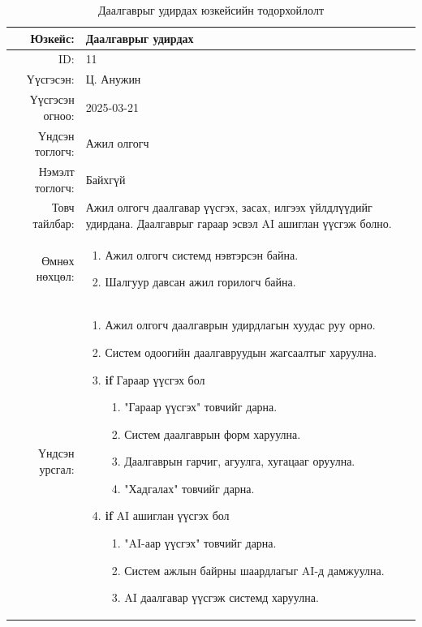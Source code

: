 \begin{longtable}{|r|p{11.5cm}|}
    \caption{Даалгаврыг удирдах юзкейсийн тодорхойлолт}
    \label{table:usecase11}\\ \hline
    {Юзкейс:} & {Даалгаврыг удирдах}\\ \hline
    {ID:} & {11}\\ \hline
    {Үүсгэсэн:} & {Ц. Анужин}\\ \hline
    {Үүсгэсэн огноо:} & {2025-03-21}\\ \hline
    {Үндсэн тоглогч:} & {Ажил олгогч}\\ \hline
    {Нэмэлт тоглогч:} & {Байхгүй}\\ \hline
    {Товч тайлбар:} & {Ажил олгогч даалгавар үүсгэх, засах, илгээх үйлдлүүдийг удирдана. Даалгаврыг гараар эсвэл AI ашиглан үүсгэж болно.}\\ \hline
    {Өмнөх нөхцөл:} & {\begin{enumerate}[nosep]
        \item Ажил олгогч системд нэвтэрсэн байна.
        \item Шалгуур давсан ажил горилогч байна.
    \end{enumerate}}\\ \hline
    {Үндсэн урсгал:} & {\begin{enumerate}[nosep]
        \item Ажил олгогч даалгаврын удирдлагын хуудас руу орно.
        \item Систем одоогийн даалгавруудын жагсаалтыг харуулна.
        \item \textbf{if} Гараар үүсгэх бол
            \begin{enumerate}[nosep,label*=\arabic*.]
                \item "Гараар үүсгэх" товчийг дарна.
                \item Систем даалгаврын форм харуулна.
                \item Даалгаврын гарчиг, агуулга, хугацааг оруулна.
                \item "Хадгалах" товчийг дарна.
            \end{enumerate}
        \item \textbf{if} AI ашиглан үүсгэх бол
            \begin{enumerate}[nosep,label*=\arabic*.]
                \item "AI-аар үүсгэх" товчийг дарна.
                \item Систем ажлын байрны шаардлагыг AI-д дамжуулна.
                \item AI даалгавар үүсгэж системд харуулна.

\end{enumerate}
\end{enumerate}}
\end{longtable}
